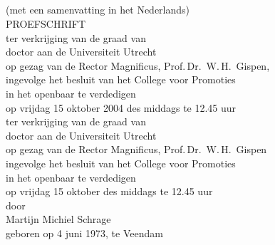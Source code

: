 \parbox{\oddCenterArea}{
\begin{center}
  {\sffamily\bfseries\Huge\engtitle\\
  \vspace{0.1cm}
  \huge\engsubtitle\\}
  \vspace{1cm}
  {\sffamily\huge\nltitle\\
  \vspace{0.1cm}
  \LARGE\nlsubtitle\\}
  
  \vspace{4mm}
   (met een samenvatting in het Nederlands)  \\
\vspace{1.6cm}
  {\sffamily\Large PROEFSCHRIFT\\}
  \vspace{1.6cm}
  ter verkrijging van de graad van\\
  doctor aan de Universiteit Utrecht\\
  op gezag van de Rector Magnificus, Prof.\,Dr.~W.\,H.~Gispen,\\
  ingevolge het besluit van het College voor Promoties\\
  in het openbaar te verdedigen\\
  op vrijdag 15 oktober 2004 des middags te 12.45 uur\\
\bc
  ter verkrijging van de graad van\\
  doctor aan de Universiteit Utrecht\\
  op gezag van de Rector Magnificus, Prof.\,Dr.~W.\,H.~Gispen\\
  ingevolge het besluit van het College voor Promoties\\
  in het openbaar te verdedigen\\
  op vrijdag 15 oktober des middags te 12.45 uur\\ \ec
  \vspace{1.1cm} %
  door\\
  \vspace{0.9cm} %
  {\sffamily\Large Martijn Michiel Schrage\\}
  \vspace{1cm}
  geboren op 4 juni 1973, te Veendam
\end{center}
}

